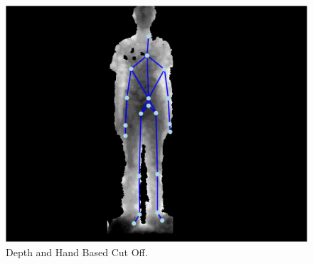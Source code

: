 \begin{figure}[h]
\begin{center}
\includegraphics[scale=0.4]{./design/parse3} 
\end{center}
\caption{Depth and Hand Based Cut Off.}
\label{fig:depth and hand based cut off}
\end{figure} 
